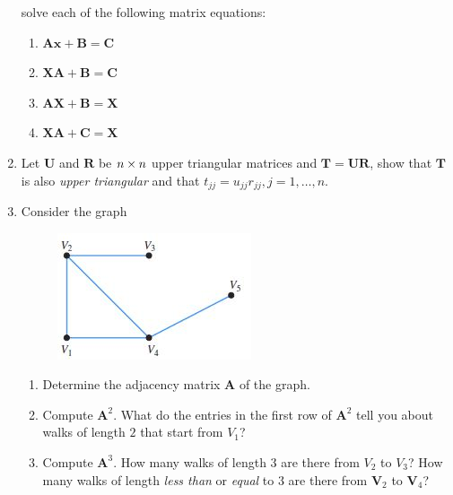 \begin{enumerate}
\[\]
solve each of the following matrix equations:
\begin{enumerate}
\item
$\bm{Ax}+\bm B=\bm C$
\item
$\bm{XA}+\bm B=\bm C$
\item
$\bm{AX}+\bm B=\bm X$
\item
$\bm{XA}+\bm C=\bm X$
\end{enumerate}
\item
Let $\bm U$ and $\bm R$ be $n\times n$ upper triangular matrices and $\bm T=\bm{UR}$, show that $\bm T$ is also \textit{upper triangular} and that $t_{jj}=u_{jj}r_{jj},j=1,\dots,n.$
\item
Consider the graph
\begin{figure}[H]
\centering
\includegraphics{week2/adj}
\end{figure}
\begin{enumerate}
\item
Determine the adjacency matrix $\bm A$ of the graph.
\item
Compute $\bm A^2$. What do the entries in the first row of $\bm A^2$ tell you about walks of length $2$ that start from $V_1$?
\item
Compute $\bm A^3$. How many walks of length $3$
are there from $V_2$ to $V_3$? How many walks of
length \textit{less than} or \textit{equal} to $3$ are there from $\bm V_2$ to $\bm V_4$?
\end{enumerate}
\end{enumerate}
